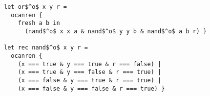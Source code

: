 \begin{lstlisting}
let or$^o$ x y r =
  ocanren {
    fresh a b in
      (nand$^o$ x x a & nand$^o$ y y b & nand$^o$ a b r) }

let rec nand$^o$ x y r =
  ocanren {
    (x === true & y === true & r === false) |
    (x === true & y === false & r === true) |
    (x === false & y === true & r === true) |
    (x === false & y === false & r === true) }
\end{lstlisting}